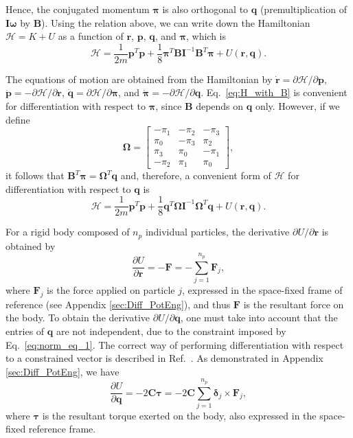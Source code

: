 \documentclass[aip,jcp,reprint,amsmath,amssymb]{revtex4-1}
\newcommand{\mt}[1]{\boldsymbol{\mathbf{#1}}}           %
\newcommand{\vt}[1]{\boldsymbol{\mathbf{#1}}}           %
\newcommand{\tr}[1]{#1^T}                               %
\newcommand{\diff}[2]{\dfrac{\partial #1}{\partial #2}} %
\begin{document}
Hence, the conjugated momentum $\vt \pi$ is also orthogonal to $\vt q$ (premultiplication of $\mt I \vt \omega$ by $\mt B$). Using the relation above, we can write down the Hamiltonian $\mathcal{H} = K + U$ as a function of $\vt r$, $\vt p$, $\vt q$, and $\vt \pi$, which is
\begin{equation}
\label{eq:H_with_B}
\mathcal{H} = \frac{1}{2m} \tr{\vt p} \vt p + \frac{1}{8} \tr{\vt \pi} {\mt B} {\mt I}^{-1} \tr{\mt B} \vt \pi + U(\vt r, \vt q).
\end{equation}

The equations of motion are obtained from the Hamiltonian by $\dot{\vt r} = \partial \mathcal{H} / \partial \vt p$, $\dot{\vt p} = -\partial \mathcal{H} / \partial \vt r$, $\dot{\vt q} = \partial \mathcal{H} / \partial \vt \pi$, and $\dot{\vt \pi} = -\partial \mathcal{H} / \partial \vt q$.\cite{Goldstein2002} Eq.~\ref{eq:H_with_B} is convenient for differentiation with respect to $\vt \pi$, since $\mt B$ depends on $\vt q$ only. However, if we define
\[
\mt \Omega = \left[
\begin{array}{rrrr}
-\pi_1 & -\pi_2 & -\pi_3 \\
 \pi_0 & -\pi_3 &  \pi_2 \\
 \pi_3 &  \pi_0 & -\pi_1 \\
-\pi_2 &  \pi_1 &  \pi_0
\end{array}
\right],
\]
it follows that $\tr{\mt B}{\vt \pi} = \tr{\mt \Omega}{\vt q}$ and, therefore, a convenient form of $\mathcal{H}$ for differentiation with respect to $\vt q$ is
\begin{equation}
\label{eq:H_with_Omega}
\mathcal{H} = \frac{1}{2m} \tr{\vt p} \vt p + \frac{1}{8} \tr{\vt q} {\mt \Omega} {\mt I}^{-1} \tr{\mt \Omega} \vt q + U(\vt r, \vt q).
\end{equation}

For a rigid body composed of $n_p$ individual particles, the derivative $\partial U/\partial \vt r$ is obtained by
\[
\diff{U}{\vt r} = -\vt F = -\sum_{j=1}^{n_p} {\vt F_j},
\]
where $\vt F_j$ is the force applied on particle $j$, expressed in the space-fixed frame of reference (see Appendix \ref{sec:Diff_PotEng}), and thus $\vt F$ is the resultant force on the body. To obtain the derivative $\partial U/\partial \vt q$, one must take into account that the entries of $\vt q$ are not independent, due to the constraint imposed by Eq.~\ref{eq:norm_eq_1}. The correct way of performing differentiation with respect to a constrained vector is described in Ref.~. As demonstrated in Appendix \ref{sec:Diff_PotEng}, we have
\[
\diff{U}{\vt q} = -2 \mt C \vt \tau = -2 \mt C \sum_{j=1}^{n_p} {\vt \delta_j} \times {\vt F_j},
\]
where $\vt \tau$ is the resultant torque exerted on the body, also expressed in the space-fixed reference frame.
\end{document}
